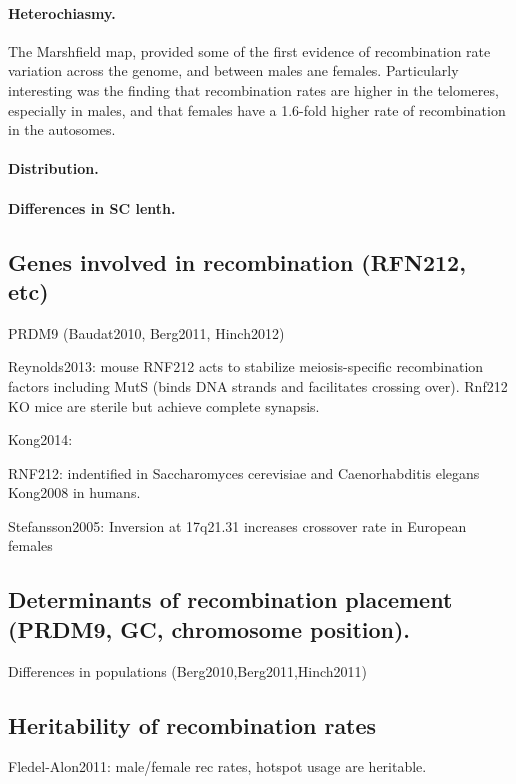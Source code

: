 \paragraph{Heterochiasmy.}

The Marshfield map\cite{Broman1998}, provided some of the first evidence of recombination rate variation across the genome, and between males ane females.
Particularly interesting was the finding that recombination rates are higher in the telomeres, especially in males, and that females have a 1.6-fold higher rate of recombination in the autosomes.

\paragraph{Distribution.}
\paragraph{Differences in SC lenth.}

\subsection{Genes involved in recombination (RFN212, etc)}

PRDM9 (Baudat2010, Berg2011, Hinch2012)

Reynolds2013: mouse RNF212 acts to stabilize meiosis-specific recombination factors including MutS (binds DNA strands and facilitates crossing over).
Rnf212 KO mice are sterile but achieve complete synapsis.

Kong2014: 

RNF212: indentified in Saccharomyces cerevisiae and Caenorhabditis elegans
Kong2008 in humans.

Stefansson2005: Inversion at 17q21.31 increases crossover rate in European females

\subsection{Determinants of recombination placement (PRDM9, GC, chromosome position).}

Differences in populations (Berg2010,Berg2011,Hinch2011)

\subsection{Heritability of recombination rates}
Fledel-Alon2011: male/female rec rates, hotspot usage are heritable.

